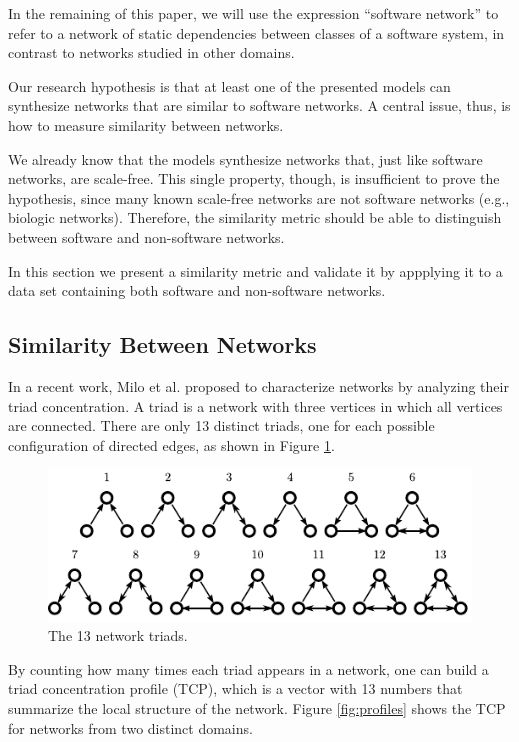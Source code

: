 In the remaining of this paper, we will use the expression ``software network''
to refer to a network of static dependencies between classes of a software
system, in contrast to networks studied in other domains.

Our research hypothesis is that at least one of the presented models can
synthesize networks that are similar to software networks. A central issue,
thus, is how to measure similarity between networks.

We already know that the models synthesize networks that, just like software
networks, are scale-free. This single property, though, is insufficient to prove
the hypothesis, since many known scale-free networks are not software networks
(e.g., biologic networks). Therefore, the similarity metric should be able to
distinguish between software and non-software networks.

In this section we present a similarity metric and validate it by appplying it
to a data set containing both software and non-software networks. 

\subsection{Similarity Between Networks}

In a recent work, Milo et al. \cite{Milo2002} proposed to characterize networks
by analyzing their triad concentration. A triad is a network with three vertices
in which all vertices are connected. There are only 13 distinct triads, one for
each possible configuration of directed edges, as shown in Figure
\ref{fig:triads}.

\begin{figure}[t]
\centering
\includegraphics{triads}
\caption{The 13 network triads.}
\label{fig:triads}
\end{figure}

By counting how many times each triad appears in a network, one can build a
triad concentration profile (TCP), which is a vector with 13 numbers that
summarize the local structure of the network. Figure \ref{fig:profiles} shows
the TCP for networks from two distinct domains.

